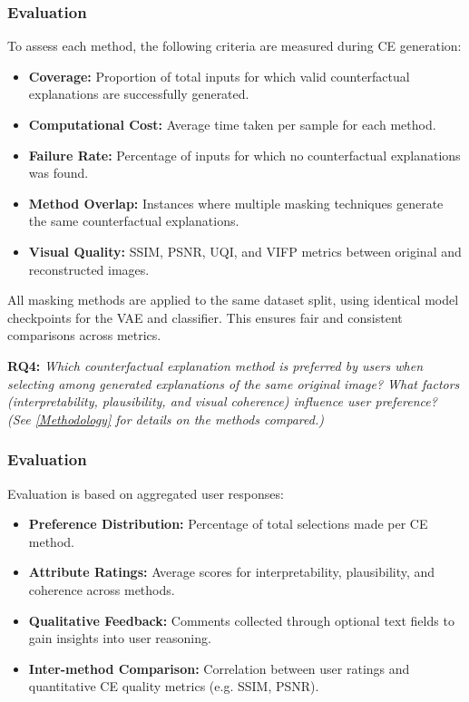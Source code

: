     \subsubsection*{Evaluation}
    To assess each method, the following criteria are measured during CE generation:
    \begin{itemize}
        \item \textbf{Coverage:} Proportion of total inputs for which valid counterfactual explanations are successfully generated.
        \item \textbf{Computational Cost:} Average time taken per sample for each method.
        \item \textbf{Failure Rate:} Percentage of inputs for which no counterfactual explanations was found.
        \item \textbf{Method Overlap:} Instances where multiple masking techniques generate the same counterfactual explanations.
        \item \textbf{Visual Quality:} SSIM, PSNR, UQI, and VIFP metrics between original and reconstructed images.
    \end{itemize}

    All masking methods are applied to the same dataset split, using identical model checkpoints for the VAE and classifier. This ensures fair and consistent comparisons across metrics.
    
\textbf{RQ4:} \textit{ Which counterfactual explanation method is preferred by users when selecting among generated explanations of the same original image? What factors (interpretability, plausibility, and visual coherence) influence user preference? (See \cref{Methodology} for details on the methods compared.)}

    \subsubsection*{Evaluation}
    Evaluation is based on aggregated user responses:
    
    \begin{itemize}
        \item \textbf{Preference Distribution:} Percentage of total selections made per CE method.
        \item \textbf{Attribute Ratings:} Average scores for interpretability, plausibility, and coherence across methods.
        \item \textbf{Qualitative Feedback:} Comments collected through optional text fields to gain insights into user reasoning.
        \item \textbf{Inter-method Comparison:} Correlation between user ratings and quantitative CE quality metrics (e.g. SSIM, PSNR).
    \end{itemize}

